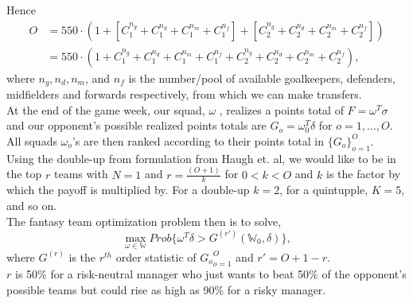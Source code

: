 					Hence
					\begin{equation*}
						\begin{aligned}
							O &= 550 \cdot (1 + [C_1^{n_g} +C_1^{n_d}+C_1^{n_m} +C_1^{n_f}] + [C_2^{n_g} +C_2^{n_d}+C_2^{n_m} +C_2^{n_f}])\\
							&= 550 \cdot  (1 + C_1^{n_g} +C_1^{n_d}+C_1^{n_m} +C_1^{n_f} + C_2^{n_g} +C_2^{n_d}+C_2^{n_m} +C_2^{n_f}),
						\end{aligned}
					\end{equation*}
					where $n_g,n_d,n_m$, and $n_f$ is the number/pool of available goalkeepers, defenders, midfielders and forwards respectively, from which we can make transfers. \\

					At the end of the game week, our squad, $\omega$ , realizes a points total of $F=\omega^T\sigma$ and our opponent’s possible realized points totals are $G_o=\omega_0^T\delta$  for $o = 1,\dots,O$. All squads $\omega_o$’s are then ranked according to their points total in $\{G_o\}^O_{o=1}$.\\

					Using the double-up from formulation from Haugh et. al, we would like to be in the top $r$ teams with $N=1$ and $r =\frac{(O+1)}{k}$ for $0 < k<O$ and $k$ is the factor by which the payoff is multiplied by. For a double-up $k=2$, for a quintupple, $K=5$, and so on.\\
					The fantasy team optimization problem then is to solve,
					\[
					\max_{\omega \in \mathbb{W}} Prob\{\omega^T\delta > G^{(r')}(\mathbb{W}_0,\delta)\},
					\]
					where $G^{(r)}$ is the $r^{th}$ order statistic of ${G_o}_{o=1}^O$ and $r' =O+1-r$.\\
					$r$ is 50\% for a risk-neutral manager who just wants to beat 50\% of the opponent's possible teams but could rise as high as 90\% for a risky manager.

